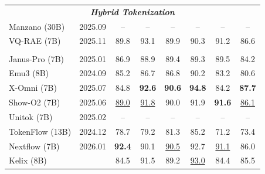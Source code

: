 \documentclass[11pt, a4paper, logo, copyright]{googledeepmind}
\begin{document}
\begin{table}[t!]
\begin{tabular}{l c  ccccc  c}
    \multicolumn{8}{c}{\textbf{\textit{Hybrid Tokenization}}} \\
    Manzano (30B)         & 2025.09 & --   & --   & --   & --   & --   & --   \\
    VQ-RAE (7B)         & 2025.11 & 89.8   & 93.1   & 89.9   & 90.3   & 91.2   & 86.6   \\

    \rowcolor{blue!10}
    \multicolumn{8}{c}{\textbf{\textit{Discrete Tokenization}}} \\
    \rowcolor{blue!10}
    Janus-Pro (7B)        & 2025.01 & 86.9   & 88.9   & 89.4   & 89.3   & 89.5   & 84.2 \\
    \rowcolor{blue!10}
    Emu3 (8B)             & 2024.09 & 85.2 & 86.7 & 86.8 & 90.2 & 83.2 & 80.6 \\
    \rowcolor{blue!10}
    X-Omni (7B)           & 2025.07 & 84.8   & \textbf{92.6}   & \textbf{90.6}   & \textbf{94.8}   & 84.2   & \textbf{87.7} \\
    \rowcolor{blue!10}
    Show-O2 (7B)          & 2025.06 &  \underline{89.0}  & \underline{91.8}   & 90.0   & 91.9   & \textbf{91.6}   & \underline{86.1} \\
    \rowcolor{blue!10}
    Unitok (7B)           & 2025.02 & --   & --   & --   & --   & --   & -- \\
    \rowcolor{blue!10}
    TokenFlow (13B)       & 2024.12 & 78.7 & 79.2 & 81.3 & 85.2 & 71.2 & 73.4 \\
    \rowcolor{blue!10}
    Nextflow (7B)         & 2026.01 & \textbf{92.4}   & 90.1   & \underline{90.5}   & 92.7   & \underline{91.1}   & 86.0 \\
    \rowcolor{blue!10}
    \rowcolor{blue!10}
    Kelix (8B)          &       & 84.5 & 91.5 & 89.2 & \underline{93.0} & 84.4 & 85.5 \\
    
    

    \bottomrule
    \end{tabular}
    \label{tab:dpg_bench_results}
\end{table}
\end{document}
